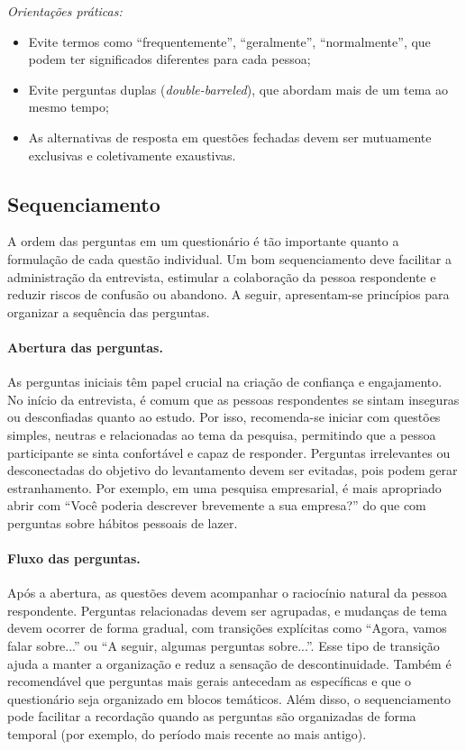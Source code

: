 \documentclass[12pt, a4paper, openany]{book}
\begin{document}
\textit{Orienta\c{c}\~oes pr\'aticas:}
\begin{itemize}
\item Evite termos como ``frequentemente'', ``geralmente'', ``normalmente'', que podem ter significados diferentes para cada pessoa;
\item Evite perguntas duplas (\textit{double-barreled}), que abordam mais de um tema ao mesmo tempo;
\item As alternativas de resposta em quest\~oes fechadas devem ser mutuamente exclusivas e coletivamente exaustivas.
\end{itemize}

\subsection{Sequenciamento}

A ordem das perguntas em um question\'ario \'e t\~ao importante quanto a formula\c{c}\~ao de cada quest\~ao individual. Um bom sequenciamento deve facilitar a administra\c{c}\~ao da entrevista, estimular a colabora\c{c}\~ao da pessoa respondente e reduzir riscos de confus\~ao ou abandono. A seguir, apresentam-se princ\'ipios para organizar a sequ\^encia das perguntas.

\paragraph{Abertura das perguntas.} As perguntas iniciais t\^em papel crucial na cria\c{c}\~ao de confian\c{c}a e engajamento. No in\'icio da entrevista, \'e comum que as pessoas respondentes se sintam inseguras ou desconfiadas quanto ao estudo. Por isso, recomenda-se iniciar com quest\~oes simples, neutras e relacionadas ao tema da pesquisa, permitindo que a pessoa participante se sinta confort\'avel e capaz de responder. Perguntas irrelevantes ou desconectadas do objetivo do levantamento devem ser evitadas, pois podem gerar estranhamento. Por exemplo, em uma pesquisa empresarial, \'e mais apropriado abrir com ``Voc\^e poderia descrever brevemente a sua empresa?'' do que com perguntas sobre h\'abitos pessoais de lazer.

\paragraph{Fluxo das perguntas.} Ap\'os a abertura, as quest\~oes devem acompanhar o racioc\'inio natural da pessoa respondente. Perguntas relacionadas devem ser agrupadas, e mudan\c{c}as de tema devem ocorrer de forma gradual, com transi\c{c}\~oes expl\'icitas como ``Agora, vamos falar sobre...'' ou ``A seguir, algumas perguntas sobre...''. Esse tipo de transi\c{c}\~ao ajuda a manter a organiza\c{c}\~ao e reduz a sensa\c{c}\~ao de descontinuidade. Tamb\'em \'e recomend\'avel que perguntas mais gerais antecedam as espec\'ificas e que o question\'ario seja organizado em blocos tem\'aticos. Al\'em disso, o sequenciamento pode facilitar a recorda\c{c}\~ao quando as perguntas s\~ao organizadas de forma temporal (por exemplo, do per\'iodo mais recente ao mais antigo).
\end{document}
